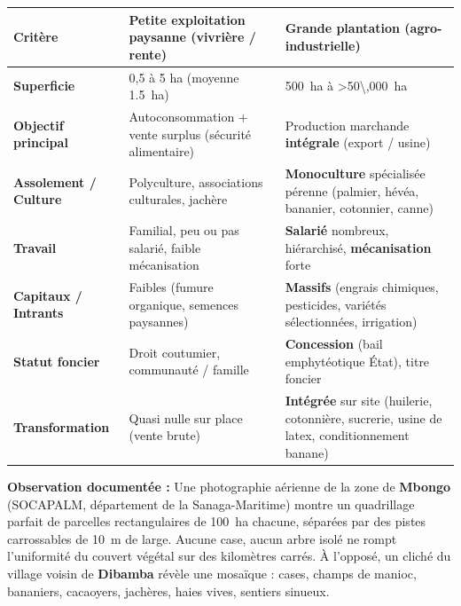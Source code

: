 \documentclass[11pt]{article}
\begin{document}
\begin{center}
\begin{tabularx}{\linewidth}{|l|X|X|}
\hline
\rowcolor{popblueL}
\textbf{Critère} & \textbf{Petite exploitation paysanne (vivrière / rente)} & \textbf{Grande plantation (agro-industrielle)} \\
\hline
\textbf{Superficie} & 0,5 à 5 ha (moyenne \SI{1,5}{ha}) & \SI{500}{ha} à \SI{>50\,000}{ha} \\
\hline
\textbf{Objectif principal} & Autoconsommation + vente surplus (sécurité alimentaire) & Production marchande \textbf{intégrale} (export / usine) \\
\hline
\textbf{Assolement / Culture} & Polyculture, associations culturales, jachère & \textbf{Monoculture} spécialisée pérenne (palmier, hévéa, bananier, cotonnier, canne) \\
\hline
\textbf{Travail} & Familial, peu ou pas salarié, faible mécanisation & \textbf{Salarié} nombreux, hiérarchisé, \textbf{mécanisation} forte \\
\hline
\textbf{Capitaux / Intrants} & Faibles (fumure organique, semences paysannes) & \textbf{Massifs} (engrais chimiques, pesticides, variétés sélectionnées, irrigation) \\
\hline
\textbf{Statut foncier} & Droit coutumier, communauté / famille & \textbf{Concession} (bail emphytéotique État), titre foncier \\
\hline
\textbf{Transformation} & Quasi nulle sur place (vente brute) & \textbf{Intégrée} sur site (huilerie, cotonnière, sucrerie, usine de latex, conditionnement banane) \\
\hline
\end{tabularx}
\end{center}

\medskip\noindent \textbf{Observation documentée :} Une photographie aérienne de la zone de \textbf{Mbongo} (SOCAPALM, département de la Sanaga-Maritime) montre un quadrillage parfait de parcelles rectangulaires de \SI{100}{ha} chacune, séparées par des pistes carrossables de \SI{10}{m} de large. Aucune case, aucun arbre isolé ne rompt l'uniformité du couvert végétal sur des kilomètres carrés. À l'opposé, un cliché du village voisin de \textbf{Dibamba} révèle une mosaïque : cases, champs de manioc, bananiers, cacaoyers, jachères, haies vives, sentiers sinueux.
\end{document}
